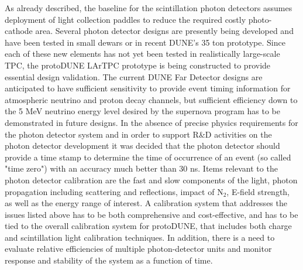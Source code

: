 	As already described, the baseline for the scintillation photon detectors assumes deployment of light collection paddles to reduce the required costly photo-cathode area. Several photon detector designs are presently being developed and have been tested in small dewars or in recent DUNE's 35 ton prototype. Since each of these new elements has not yet been tested in realistically large-scale TPC, the protoDUNE LArTPC prototype is being constructed to provide essential design validation. The current DUNE Far Detector designs are anticipated to have sufficient sensitivity to provide event timing information for atmospheric neutrino and proton decay channels, but sufficient efficiency down to the 5 MeV neutrino energy level desired by the supernova program has to be demonstrated in future designs.
In the absence of precise physics requirements for the photon detector system and in order to support R\&D activities on the photon detector development it was decided that the photon detector should provide a time stamp to determine the time of occurrence of an event (so called "time zero") with an accuracy much better than 30 ns.
	Items relevant to the photon detector calibration are the fast and slow components of the light, photon propagation including scattering and reflections, impact of N$_2$, E-field strength, 
as well as the energy range of interest. A calibration system that addresses the issues listed above has to be both comprehensive and cost-effective, and has to be tied to the overall 
calibration system for protoDUNE, that includes both charge and scintillation light calibration techniques. %
In addition, there is a need to evaluate relative efficiencies of multiple photon-detector units and monitor response and stability of the system as a function of time.
